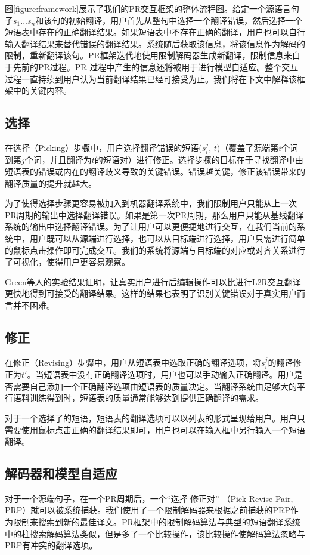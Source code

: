 \documentclass[master, winfont]{njuthesis}
\begin{document}
图\ref{figure:framework}展示了我们的PR交互框架的整体流程图。给定一个源语言句子$s_1 ... s_n$和该句的初始翻译，用户首先从整句中选择一个翻译错误，然后选择一个短语表中存在的正确翻译结果。如果短语表中不存在正确的翻译，用户也可以自行输入翻译结果来替代错误的翻译结果。系统随后获取该信息，将该信息作为解码的限制，重新翻译该句。PR框架迭代地使用限制解码器生成新翻译，限制信息来自于先前的PR过程。PR 过程中产生的信息还将被用于进行模型自适应。整个交互过程一直持续到用户认为当前翻译结果已经可接受为止。我们将在下文中解释该框架中的关键内容。
\subsection{选择}
在选择（Picking）步骤中，用户选择翻译错误的短语($s_i^j$, $t$)（覆盖了源端第$i$个词到第$j$个词，并且翻译为$t$的短语对）进行修正。选择步骤的目标在于寻找翻译中由短语表的错误或内在的翻译歧义导致的关键错误。错误越关键，修正该错误带来的翻译质量的提升就越大\cite{mohit2007localization}。

为了使得选择步骤更容易被加入到机器翻译系统中，我们限制用户只能从上一次PR周期的输出中选择翻译错误。如果是第一次PR周期，那么用户只能从基线翻译系统的输出中选择翻译错误。为了让用户可以更便捷地进行交互，在我们当前的系统中，用户既可以从源端进行选择，也可以从目标端进行选择，用户只需进行简单的鼠标点击操作即可完成交互。我们的系统将源端与目标端的对应或对齐关系进行了可视化，使得用户更容易观察。

Green等人\cite{green2014human}的实验结果证明，让真实用户进行后编辑操作可以比进行L2R交互翻译更快地得到可接受的翻译结果。这样的结果也表明了识别关键错误对于真实用户而言并不困难。
\subsection{修正}
在修正（Revising）步骤中，用户从短语表中选取正确的翻译选项，将$s_i^j$的翻译修正为$t'$。当短语表中没有正确翻译选项时，用户也可以手动输入正确翻译。用户是否需要自己添加一个正确翻译选项由短语表的质量决定。当翻译系统由足够大的平行语料训练得到时，短语表的质量通常能够达到提供正确翻译的需求。

对于一个选择了的短语，短语表的翻译选项可以以列表的形式呈现给用户。用户只需要使用鼠标点击正确的翻译结果即可，用户也可以在输入框中另行输入一个短语翻译。
\subsection{解码器和模型自适应}
对于一个源端句子，在一个PR周期后，一个“选择-修正对” （Pick-Revise Pair, PRP）就可以被系统捕获。我们使用了一个限制解码器来根据之前捕获的PRP作为限制来搜索到新的最佳译文。PR框架中的限制解码算法与典型的短语翻译系统中的柱搜索解码算法类似，但是多了一个比较操作，该比较操作使解码算法忽略与PRP有冲突的翻译选项。
\end{document}
